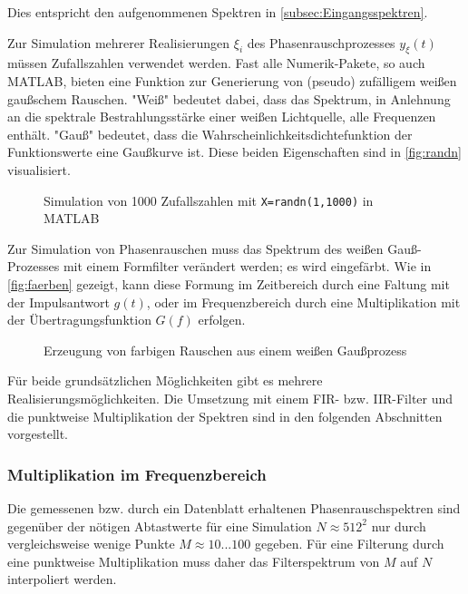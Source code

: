 Dies entspricht den aufgenommenen Spektren in \autoref{subsec:Eingangsspektren}.

Zur Simulation mehrerer Realisierungen $\xi_i$ des Phasenrauschprozesses $y_\xi(t)$ müssen Zufallszahlen verwendet werden. Fast alle Numerik-Pakete, so auch MATLAB, bieten eine Funktion zur Generierung von (pseudo) zufälligem weißen gaußschem Rauschen. "Weiß" bedeutet dabei, dass das Spektrum, in Anlehnung an die spektrale Bestrahlungsstärke einer weißen Lichtquelle, alle Frequenzen enthält. "Gauß" bedeutet, dass die Wahrscheinlichkeitsdichtefunktion der Funktionswerte eine Gaußkurve ist. Diese beiden Eigenschaften sind in \autoref{fig:randn} visualisiert.

\begin{figure}[H]
	\centering
	\hfill
	\caption[MATLAB randn]{Simulation von 1000 Zufallszahlen mit \texttt{X=randn(1,1000)} in MATLAB}
	\label{fig:randn}
\end{figure}

Zur Simulation von Phasenrauschen muss das Spektrum des weißen Gauß-Prozesses mit einem Formfilter verändert werden; es wird eingefärbt. Wie in \autoref{fig:faerben} gezeigt, kann diese Formung im Zeitbereich durch eine Faltung mit der Impulsantwort $g(t)$, oder im Frequenzbereich durch eine Multiplikation mit der Übertragungsfunktion $G(f)$ erfolgen.

\begin{figure}[H]
	\centering
	\caption[Erzeugen von farbigem Rauschen]{Erzeugung von farbigen Rauschen aus einem weißen Gaußprozess}
	\label{fig:faerben}
\end{figure}

Für beide grundsätzlichen Möglichkeiten gibt es mehrere Realisierungsmöglichkeiten. Die Umsetzung mit einem FIR- bzw. IIR-Filter und die punktweise Multiplikation der Spektren sind in den folgenden Abschnitten vorgestellt.

\subsubsection{Multiplikation im Frequenzbereich}
Die gemessenen bzw. durch ein Datenblatt erhaltenen Phasenrauschspektren sind gegenüber der nötigen Abtastwerte für eine Simulation $N\approx512^2$ nur durch vergleichsweise wenige Punkte $M\approx10...100$ gegeben. Für eine Filterung durch eine punktweise Multiplikation muss daher das Filterspektrum von $M$ auf $N$ interpoliert werden.

